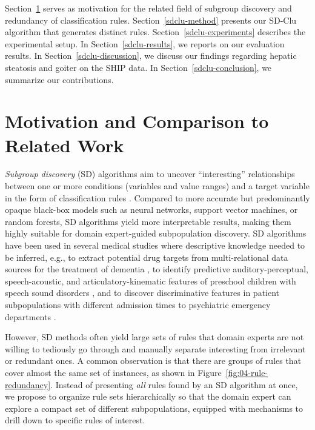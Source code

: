 \documentclass[
  oneside]{book}
\begin{document}
Section~\ref{sdclu-intro} serves as motivation for the related field of subgroup discovery and redundancy of classification rules.
Section~\ref{sdclu-method} presents our SD-Clu algorithm that generates distinct rules.
Section~\ref{sdclu-experiments} describes the experimental setup.
In Section~\ref{sdclu-results}, we reports on our evaluation results.
In Section~\ref{sdclu-discussion}, we discuss our findings regarding hepatic steatosis and goiter on the SHIP data.
In Section~\ref{sdclu-conclusion}, we summarize our contributions.

\hypertarget{sdclu-intro}{%
\section{Motivation and Comparison to Related Work}\label{sdclu-intro}}

\emph{Subgroup discovery} (SD) algorithms aim to uncover ``interesting'' relationships between one or more conditions (variables and value ranges) and a target variable in the form of classification rules \autocite{Herrera11,Atzmueller15}.
Compared to more accurate but predominantly opaque black-box models such as neural networks, support vector machines, or random forests, SD algorithms yield more interpretable results, making them highly suitable for domain expert-guided subpopulation discovery.
SD algorithms have been used in several medical studies where descriptive knowledge needed to be inferred, e.g., to extract potential drug targets from multi-relational data sources for the treatment of dementia \autocite{Nguyen:Nature15}, to identify predictive auditory-perceptual, speech-acoustic, and articulatory-kinematic features of preschool children with speech sound disorders \autocite{Vick14}, and to discover discriminative features in patient subpopulations with different admission times to psychiatric emergency departments \autocite{Carmona11}.

However, SD methods often yield large sets of rules that domain experts are not willing to tediously go through and manually separate interesting from irrelevant or redundant ones.
A common observation is that there are groups of rules that cover almost the same set of instances, as shown in Figure~\ref{fig:04-rule-redundancy}.
Instead of presenting \emph{all} rules found by an SD algorithm at once, we propose to organize rule sets hierarchically so that the domain expert can explore a compact set of different subpopulations, equipped with mechanisms to drill down to specific rules of interest.
\end{document}
